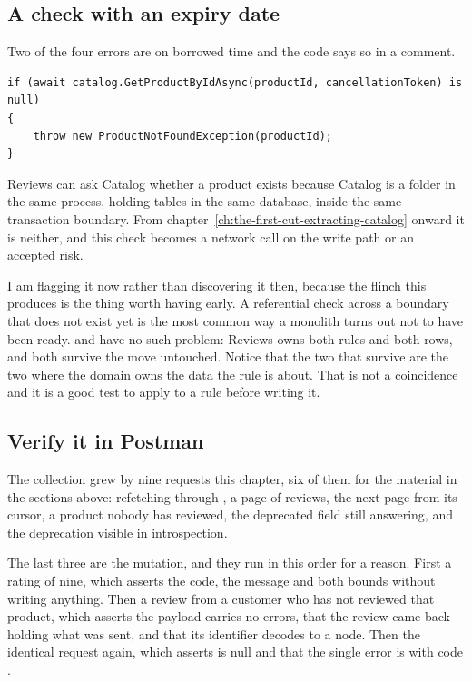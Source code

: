 \subsection*{A check with an expiry date}

%
Two of the four errors are on borrowed time and the code says so in a comment.

\begin{verbatim}
if (await catalog.GetProductByIdAsync(productId, cancellationToken) is null)
{
    throw new ProductNotFoundException(productId);
}
\end{verbatim}

Reviews can ask Catalog whether a product exists because Catalog is a folder in
the same process, holding tables in the same database, inside the same
transaction boundary. From
chapter~\ref{ch:the-first-cut-extracting-catalog} onward it is neither, and this
check becomes a network call on the write path or an accepted risk.

I am flagging it now rather than discovering it then, because the flinch this
produces is the thing worth having early. A referential check across a boundary
that does not exist yet is the most common way a monolith turns out not to have
been ready.  and  have no
such problem: Reviews owns both rules and both rows, and both survive the move
untouched. Notice that the two that survive are the two where the domain owns
the data the rule is about. That is not a coincidence and it is a good test to
apply to a rule before writing it.

\subsection*{Verify it in Postman}

%
The collection grew by nine requests this chapter, six of them for the material
in the sections above: refetching through , a page of reviews, the
next page from its cursor, a product nobody has reviewed, the deprecated field
still answering, and the deprecation visible in introspection.

The last three are the mutation, and they run in this order for a reason. First
a rating of nine, which asserts the code, the message and both bounds without
writing anything. Then a review from a customer who has not reviewed that
product, which asserts the payload carries no errors, that the review came back
holding what was sent, and that its identifier decodes to a  node.
Then the identical request again, which asserts  is null and that
the single error is  with code
.

